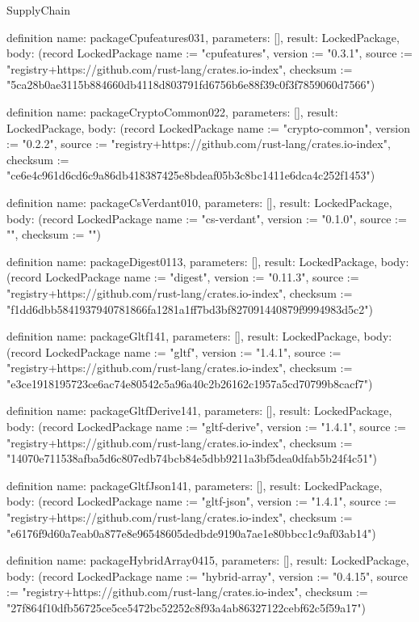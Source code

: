 \begin{lexlean}{SupplyChain}
\begin{semanticmodule}
definition{
  name: packageCpufeatures031,
  parameters: [],
  result: LockedPackage,
  body: (record LockedPackage {name := "cpufeatures", version := "0.3.1", source := "registry+https://github.com/rust-lang/crates.io-index", checksum := "5ca28b0ae3115b884660db4118d803791fd6756b6e88f39c0f3f7859060d7566"})
}

definition{
  name: packageCryptoCommon022,
  parameters: [],
  result: LockedPackage,
  body: (record LockedPackage {name := "crypto-common", version := "0.2.2", source := "registry+https://github.com/rust-lang/crates.io-index", checksum := "ce6e4c961d6cd6c9a86db418387425e8bdeaf05b3c8bc1411e6dca4c252f1453"})
}

definition{
  name: packageCsVerdant010,
  parameters: [],
  result: LockedPackage,
  body: (record LockedPackage {name := "cs-verdant", version := "0.1.0", source := "", checksum := ""})
}

definition{
  name: packageDigest0113,
  parameters: [],
  result: LockedPackage,
  body: (record LockedPackage {name := "digest", version := "0.11.3", source := "registry+https://github.com/rust-lang/crates.io-index", checksum := "f1dd6dbb5841937940781866fa1281a1ff7bd3bf827091440879f9994983d5c2"})
}

definition{
  name: packageGltf141,
  parameters: [],
  result: LockedPackage,
  body: (record LockedPackage {name := "gltf", version := "1.4.1", source := "registry+https://github.com/rust-lang/crates.io-index", checksum := "e3ce1918195723ce6ac74e80542c5a96a40c2b26162c1957a5cd70799b8cacf7"})
}

definition{
  name: packageGltfDerive141,
  parameters: [],
  result: LockedPackage,
  body: (record LockedPackage {name := "gltf-derive", version := "1.4.1", source := "registry+https://github.com/rust-lang/crates.io-index", checksum := "14070e711538afba5d6c807edb74bcb84e5dbb9211a3bf5dea0dfab5b24f4c51"})
}

definition{
  name: packageGltfJson141,
  parameters: [],
  result: LockedPackage,
  body: (record LockedPackage {name := "gltf-json", version := "1.4.1", source := "registry+https://github.com/rust-lang/crates.io-index", checksum := "e6176f9d60a7eab0a877e8e96548605dedbde9190a7ae1e80bbcc1c9af03ab14"})
}

definition{
  name: packageHybridArray0415,
  parameters: [],
  result: LockedPackage,
  body: (record LockedPackage {name := "hybrid-array", version := "0.4.15", source := "registry+https://github.com/rust-lang/crates.io-index", checksum := "27f864f10dfb56725ce5ce5472bc52252c8f93a4ab86327122cebf62c5f59a17"})
}


\end{semanticmodule}
\end{lexlean}
